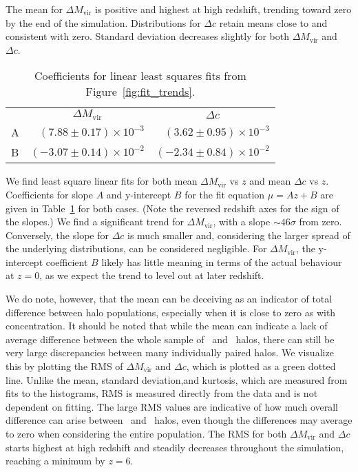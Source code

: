 The mean for $\Delta M_{\mathrm{vir}}$ is positive and highest at high redshift, trending toward zero by the end of the simulation.  Distributions for $\Delta c$ retain means close to and consistent with zero.  Standard deviation decreases slightly for both $\Delta M_{\mathrm{vir}}$ and $\Delta c$.

\begin{table}[t]
	\centering
	\caption{Coefficients for linear least squares fits from Figure~\ref{fig:fit_trends}.}
	\begin{tabular}{ l  r  r }
		\toprule
		& \multicolumn{1}{c}{$\Delta M_{\mathrm{vir}}$} & \multicolumn{1}{c}{$\Delta c$} \\
		\cmidrule(l){2-3}
		A &  $(7.88 \pm 0.17) \times 10^{-3}$ &  $(3.62 \pm 0.95) \times 10^{-3}$ \\
		B & $(-3.07 \pm 0.14) \times 10^{-2}$ & $(-2.34 \pm 0.84) \times 10^{-2}$ \\
		\bottomrule
	\end{tabular}
	\label{tab:coeffs}
\end{table}

We find least square linear fits for both mean $\Delta M_{\mathrm{vir}}$ vs $z$ and mean $\Delta c$ vs $z$.  Coefficients for slope $A$ and y-intercept $B$ for the fit equation $\mu = A z + B$ are given in Table~\ref{tab:coeffs} for both cases.  (Note the reversed redshift axes for the sign of the slopes.)  We find a significant trend for $\Delta M_{\mathrm{vir}}$, with a slope $\sim 46 \sigma$ from zero.  Conversely, the slope for $\Delta c$ is much smaller and, considering the larger spread of the underlying distributions, can be considered negligible.  For $\Delta M_{\mathrm{vir}}$, the y-intercept coefficient $B$ likely has little meaning in terms of the actual behaviour at $z = 0$, as we expect the trend to level out at later redshift.

We do note, however, that the mean can be deceiving as an indicator of total difference between halo populations, especially when it is close to zero as with concentration.  It should be noted that while the mean can indicate a lack of average difference between the whole sample of \lpt\ and \za\ halos, there can still be very large discrepancies between many individually paired halos.  We visualize this by plotting the RMS of $\Delta M_{\mathrm{vir}}$ and $\Delta c$, which is plotted as a green dotted line.  Unlike the mean, standard deviation,and kurtosis, which are measured from fits to the histograms, RMS is measured directly from the data and is not dependent on fitting.  The large RMS values are indicative of how much overall difference can arise between \lpt\ and \za\ halos, even though the differences may average to zero when considering the entire population.  The RMS for both $\Delta M_{\mathrm{vir}}$ and $\Delta c$ starts highest at high redshift and steadily decreases throughout the simulation, reaching a minimum by $z = 6$.


